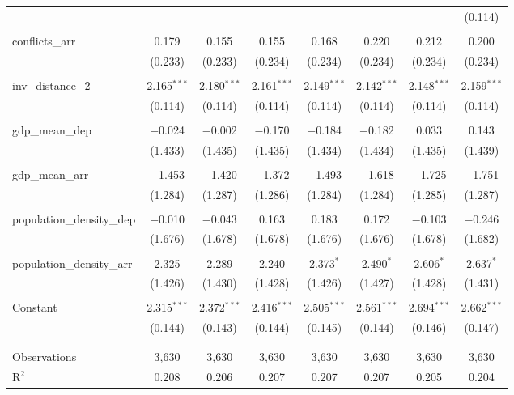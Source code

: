 \begin{table}[!htbp]
\begin{tabular}{@{\extracolsep{5pt}}lccccccc}
  &  &  &  &  &  &  & (0.114) \\ 
  & & & & & & & \\ 
 conflicts\_arr & 0.179 & 0.155 & 0.155 & 0.168 & 0.220 & 0.212 & 0.200 \\ 
  & (0.233) & (0.233) & (0.234) & (0.234) & (0.234) & (0.234) & (0.234) \\ 
  & & & & & & & \\ 
 inv\_distance\_2 & 2.165$^{***}$ & 2.180$^{***}$ & 2.161$^{***}$ & 2.149$^{***}$ & 2.142$^{***}$ & 2.148$^{***}$ & 2.159$^{***}$ \\ 
  & (0.114) & (0.114) & (0.114) & (0.114) & (0.114) & (0.114) & (0.114) \\ 
  & & & & & & & \\ 
 gdp\_mean\_dep & $-$0.024 & $-$0.002 & $-$0.170 & $-$0.184 & $-$0.182 & 0.033 & 0.143 \\ 
  & (1.433) & (1.435) & (1.435) & (1.434) & (1.434) & (1.435) & (1.439) \\ 
  & & & & & & & \\ 
 gdp\_mean\_arr & $-$1.453 & $-$1.420 & $-$1.372 & $-$1.493 & $-$1.618 & $-$1.725 & $-$1.751 \\ 
  & (1.284) & (1.287) & (1.286) & (1.284) & (1.284) & (1.285) & (1.287) \\ 
  & & & & & & & \\ 
 population\_density\_dep & $-$0.010 & $-$0.043 & 0.163 & 0.183 & 0.172 & $-$0.103 & $-$0.246 \\ 
  & (1.676) & (1.678) & (1.678) & (1.676) & (1.676) & (1.678) & (1.682) \\ 
  & & & & & & & \\ 
 population\_density\_arr & 2.325 & 2.289 & 2.240 & 2.373$^{*}$ & 2.490$^{*}$ & 2.606$^{*}$ & 2.637$^{*}$ \\ 
  & (1.426) & (1.430) & (1.428) & (1.426) & (1.427) & (1.428) & (1.431) \\ 
  & & & & & & & \\ 
 Constant & 2.315$^{***}$ & 2.372$^{***}$ & 2.416$^{***}$ & 2.505$^{***}$ & 2.561$^{***}$ & 2.694$^{***}$ & 2.662$^{***}$ \\ 
  & (0.144) & (0.143) & (0.144) & (0.145) & (0.144) & (0.146) & (0.147) \\ 
  & & & & & & & \\ 
\hline \\[-1.8ex] 
Observations & 3,630 & 3,630 & 3,630 & 3,630 & 3,630 & 3,630 & 3,630 \\ 
R$^{2}$ & 0.208 & 0.206 & 0.207 & 0.207 & 0.207 & 0.205 & 0.204 \\ 

\end{tabular}
\end{table}
